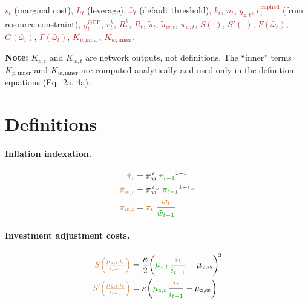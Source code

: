 \documentclass[11pt]{article}
\begin{document}
\textcolor{brown}{$s_t$} (marginal cost),
\textcolor{brown}{$L_t$} (leverage),
\textcolor{brown}{$\bar\omega_t$} (default threshold),
\textcolor{brown}{$k_t$},
\textcolor{brown}{$n_t$},
\textcolor{brown}{$y_{z,t}$},
\textcolor{brown}{$c_t^{\text{implied}}$} (from resource constraint),
\textcolor{brown}{$y_t^{\text{GDP}}$},
\textcolor{brown}{$r_t^k$},
\textcolor{brown}{$R_t^k$},
\textcolor{brown}{$R_t$},
\textcolor{brown}{$\tilde\pi_t$},
\textcolor{brown}{$\tilde\pi_{w,t}$},
\textcolor{brown}{$\pi_{w,t}$},
\textcolor{brown}{$S(\cdot)$},
\textcolor{brown}{$S'(\cdot)$},
\textcolor{brown}{$F(\bar\omega_t)$},
\textcolor{brown}{$G(\bar\omega_t)$},
\textcolor{brown}{$\Gamma(\bar\omega_t)$},
\textcolor{brown}{$K_{p,\text{inner}}$},
\textcolor{brown}{$K_{w,\text{inner}}$}.

\medskip\noindent\textbf{Note:} $K_{p,t}$ and $K_{w,t}$ are network outputs,
not definitions. The ``inner'' terms $K_{p,\text{inner}}$ and
$K_{w,\text{inner}}$ are computed analytically and used only in the
definition equations (Eq.~2a, 4a).


\section{Definitions}

\paragraph{Inflation indexation.}
\begin{align*}
  \textcolor{brown}{\tilde\pi_t}
    &= \pi_{\text{ss}}^{\,\iota}\;\textcolor{green!60!black}{\pi_{t-1}}^{1-\iota}
  \\
  \textcolor{brown}{\tilde\pi_{w,t}}
    &= \pi_{\text{ss}}^{\,\iota_w}\;\textcolor{green!60!black}{\pi_{t-1}}^{1-\iota_w}
  \\
  \textcolor{brown}{\pi_{w,t}}
    &= \textcolor{orange!80!black}{\pi_t}\;
       \frac{\textcolor{orange!80!black}{\tilde{w}_t}}{\textcolor{green!60!black}{\tilde{w}_{t-1}}}
\end{align*}

\paragraph{Investment adjustment costs.}
\begin{align*}
  \textcolor{brown}{S\!\left(\tfrac{\mu_{z,t}\,i_t}{i_{t-1}}\right)}
    &= \frac{\kappa}{2}\!\left(\textcolor{green!60!black}{\mu_{z,t}}\,
       \frac{\textcolor{orange!80!black}{i_t}}{\textcolor{green!60!black}{i_{t-1}}}
       - \mu_{z,\text{ss}}\right)^{\!2}
  \\
  \textcolor{brown}{S'\!\left(\tfrac{\mu_{z,t}\,i_t}{i_{t-1}}\right)}
    &= \kappa\!\left(\textcolor{green!60!black}{\mu_{z,t}}\,
       \frac{\textcolor{orange!80!black}{i_t}}{\textcolor{green!60!black}{i_{t-1}}}
       - \mu_{z,\text{ss}}\right)
\end{align*}
\end{document}
